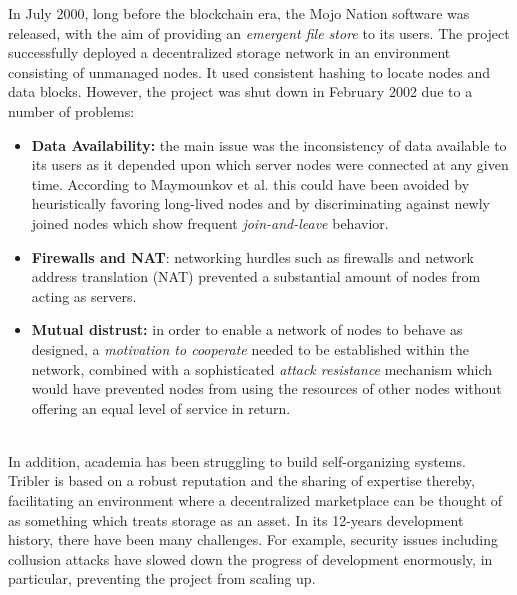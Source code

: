 \documentclass[conference]{IEEEtran}
\begin{document}
In July 2000, long before the blockchain era, the Mojo Nation software \cite{mojo-nation} was released, with the aim of providing an \textit{emergent file store} to its users.
The project successfully deployed a decentralized storage network in an environment consisting of unmanaged nodes.
It used consistent hashing \cite{consistent-hashing} to locate nodes and data blocks.
However, the project was shut down in February 2002 due to a number of problems:
\begin{itemize}
\item \textbf{Data Availability:} the main issue was the inconsistency of data available to its users as it depended upon which server nodes were connected at any given time.
According to Maymounkov et al.\cite{peer-to-peer-xor} this could have been avoided by heuristically favoring long-lived nodes and by discriminating against newly joined nodes which show frequent \textit{join-and-leave} behavior.
\item \textbf{Firewalls and NAT}: networking hurdles such as firewalls and network address translation (NAT) prevented a substantial amount of nodes from acting as servers.
\item \textbf{Mutual distrust:} in order to enable a network of nodes to behave as designed, a \textit{motivation to cooperate} needed to be established within the network, combined with a sophisticated \textit{attack resistance} mechanism which would have prevented nodes from using the resources of other nodes without offering an equal level of service in return.
\end{itemize}
\hfill
\\
In addition, academia has been struggling to build self-organizing systems.
Tribler\cite{tribler} is based on a robust reputation and the sharing of expertise thereby, facilitating an environment where a decentralized marketplace can be thought of as something which treats storage as an asset.
In its 12-years development history, there have been many challenges. 
For example, security issues including collusion attacks\cite{tribler-hurdles} have slowed down the progress of development enormously, in particular, preventing the project from scaling up.
\end{document}
